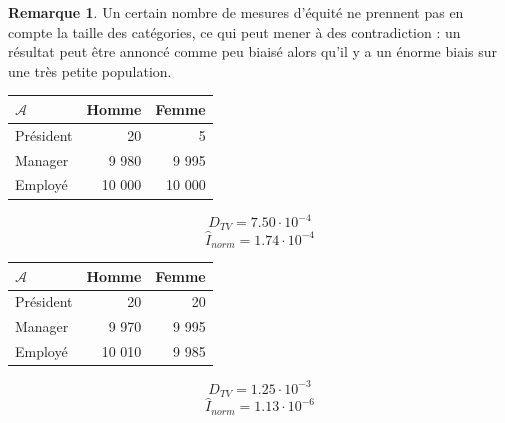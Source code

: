 \documentclass{article}
\theoremstyle{definition}
\newtheorem{myRem}{Remarque}
\begin{document}
\begin{myRem}
  Un certain nombre de mesures d'équité ne prennent pas en compte la taille des catégories, ce qui peut mener à des contradiction : un résultat peut être annoncé comme peu biaisé alors qu'il y a un énorme biais sur une très petite population.

  \begin{multicols}{2}
    \begin{tabular}{l|r|r}
      $\mathcal{A}$ & Homme & Femme \\
      \hline
      Président & 20 & 5 \\
      Manager & 9 980 & 9 995 \\
      Employé & 10 000 & 10 000 \\
    \end{tabular}
    \[
    D_{TV} = 7.50 \cdot 10^{-4}
    \]
    \[
    \hat{I}_{norm} = 1.74 \cdot 10^{-4}
    \]

    \columnbreak

    \begin{tabular}{l|r|r}
      $\mathcal{A}$ & Homme & Femme \\
      \hline
      Président & 20 & 20 \\
      Manager & 9 970 & 9 995 \\
      Employé & 10 010 & 9 985 \\
    \end{tabular}
    \[
    D_{TV} = 1.25 \cdot 10^{-3}
    \]
    \[
    \hat{I}_{norm} = 1.13 \cdot 10^{-6}
    \]
  \end{multicols}
\end{myRem}
\end{document}
